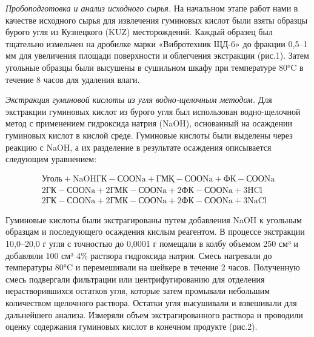 \begin{multicols}{2}
\emph{Пробоподготовка и анализ исходного сырья.} На начальном этапе
работ нами в качестве исходного сырья для извлечения гуминовых кислот
были взяты образцы бурого угля из Кузнецкого (KUZ) месторождений. Каждый
образец был тщательно измельчен на дробилке марки «Вибротехник ЩД-6» до
фракции 0,5--1 мм для увеличения площади поверхности и облегчения
экстракции (рис.1). Затем угольные образцы были высушены в сушильном
шкафу при температуре 80°C в течение 8 часов для удаления влаги.

\emph{Экстракция гуминовой кислоты из угля водно-щелочным методом.} Для
экстракции гуминовых кислот из бурого угля был использован
водно-щелочной метод с применением гидроксида натрия (NaOH), основанный
на осаждении гуминовых кислот в кислой среде. Гуминовые кислоты были
выделены через реакцию с NaOH, а их разделение в результате осаждения
описывается следующим уравнением:
\end{multicols}

\begin{equation}
\begin{aligned}
\text{Уголь} + \text{NaOH} \text{ГК} - \text{СООNa} + \text{ГМҚ} - \text{СООNa} + \text{ФК} - \text{СООNa}\\
2\text{ГК} - \text{СООNa} + 2\text{ГМК} - \text{СООNa} + 2\text{ФК} - \text{СООNa} + 3\text{HCl}\\
2\text{ГК} - \text{СООNa} + 2\text{ГМК} - \text{СООNa} + 2\text{ФК} - \text{СООNa} + 3\text{NaCl}
\end{aligned}
\end{equation}

\begin{multicols}{2}
Гуминовые кислоты были экстрагированы путем добавления NaOH к угольным
образцам и последующего осаждения кислым реагентом. В процессе
экстракции 10,0--20,0 г угля с точностью до 0,0001 г помещали в колбу
объемом 250 см³ и добавляли 100 см³ 4\% раствора гидроксида натрия.
Смесь нагревали до температуры 80°C и перемешивали на шейкере в течение
2 часов. Полученную смесь подвергали фильтрации или центрифугированию
для отделения нерастворившихся остатков угля, которые затем промывали
небольшим количеством щелочного раствора. Остатки угля высушивали и
взвешивали для дальнейшего анализа. Измеряли объем экстрагированного
раствора и проводили оценку содержания гуминовых кислот в конечном
продукте (рис.2).
\end{multicols}

